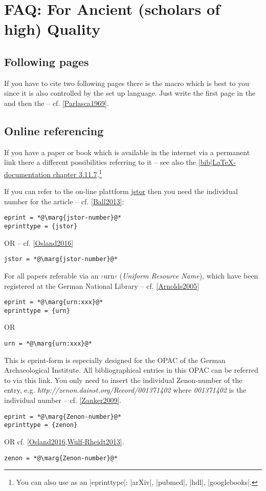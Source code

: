 \documentclass[a4paper,
10pt,
greek,
french,
spanish,
italian,
ngerman,
english
]{ltxdoc}
\begin{document}
\section{FAQ: For  Ancient (scholars of high) Quality}
\subsection{Following pages}
\DescribeMacro{\psq} If you have to cite two following pages there is the macro  which is best to you since it is also controlled by the set up language.
Just write the first page in the  and then the  -- cf. \cref{Parlasca1969}.

\subsection{Online referencing}
 If you have a paper or book which is available in the internet via a permanent link there a different possibilities referring to it --  see also the \href{http://tug.ctan.org/macros/latex/exptl/biblatex/doc/biblatex.pdf}{|bib|\LaTeX-documentation chapter 3.11.7}.\footnote{You can also use as an |eprinttype|: |arXiv|, |pubmed|, |hdl|, |googlebooks|.
}

 If you can refer to the on-line plattform \href{www.jstor.org}{jstor} then you need the individual number for the article -- cf. \cref{Ball2013}:
\begin{lstlisting}
eprint = *@\marg{jstor-number}@*
eprinttype = {jstor} 
\end{lstlisting}			
OR -- cf. \cref{Osland2016}
\begin{lstlisting}
jstor = *@\marg{jstor-number}@*
\end{lstlisting}	

For all papers referable via an ›urn‹ (\emph{Uniform Resource Name}), which have been registered at the German National Library -- cf. \cref{Arnolds2005}
\begin{lstlisting}
eprint = *@\marg{urn:xxx}@*
eprinttype = {urn} 
\end{lstlisting}			

OR
\begin{lstlisting}
urn = *@\marg{urn:xxx}@*
\end{lstlisting}	

This is eprint-form is especially designed for the OPAC of the German Archaeological Institute.
All bibliographical entries in this OPAC can be referred to via this link.
You only need to insert the individual Zenon-number of the entry, e.g. \emph{http://zenon.dainst.org/Record/001371402} where \emph{001371402} is the individual number -- cf. \cref{Zanker2009}.
\begin{lstlisting}
eprint = *@\marg{Zenon-number}@*
eprinttype = {zenon} 
\end{lstlisting}			
OR  cf. \cref{Osland2016,Wulf-Rheidt2013}.
\begin{lstlisting}
zenon = *@\marg{Zenon-number}@*
\end{lstlisting}			
\end{document}
